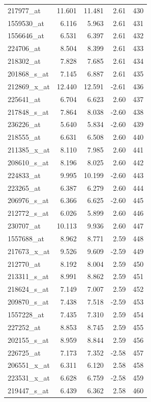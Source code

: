 \begin{footnotesize}
\begin{longtable}{lrrrr}
217977\_at & 11.601 & 11.481 & 2.61 & 430 \\
1559530\_at & 6.116 & 5.963 & 2.61 & 431 \\
1556646\_at & 6.531 & 6.397 & 2.61 & 432 \\
224706\_at & 8.504 & 8.399 & 2.61 & 433 \\
218302\_at & 7.828 & 7.685 & 2.61 & 434 \\
201868\_s\_at & 7.145 & 6.887 & 2.61 & 435 \\
212869\_x\_at & 12.440 & 12.591 & -2.61 & 436 \\
225641\_at & 6.704 & 6.623 & 2.60 & 437 \\
217848\_s\_at & 7.864 & 8.038 & -2.60 & 438 \\
236226\_at & 5.640 & 5.834 & -2.60 & 439 \\
218555\_at & 6.631 & 6.508 & 2.60 & 440 \\
211385\_x\_at & 8.110 & 7.985 & 2.60 & 441 \\
208610\_s\_at & 8.196 & 8.025 & 2.60 & 442 \\
224833\_at & 9.995 & 10.199 & -2.60 & 443 \\
223265\_at & 6.387 & 6.279 & 2.60 & 444 \\
206976\_s\_at & 6.366 & 6.625 & -2.60 & 445 \\
212772\_s\_at & 6.026 & 5.899 & 2.60 & 446 \\
230707\_at & 10.113 & 9.936 & 2.60 & 447 \\
1557688\_at & 8.962 & 8.771 & 2.59 & 448 \\
217673\_x\_at & 9.526 & 9.609 & -2.59 & 449 \\
212770\_at & 8.192 & 8.004 & 2.59 & 450 \\
213311\_s\_at & 8.991 & 8.862 & 2.59 & 451 \\
218624\_s\_at & 7.149 & 7.007 & 2.59 & 452 \\
209870\_s\_at & 7.438 & 7.518 & -2.59 & 453 \\
1557228\_at & 7.435 & 7.310 & 2.59 & 454 \\
227252\_at & 8.853 & 8.745 & 2.59 & 455 \\
202155\_s\_at & 8.959 & 8.844 & 2.59 & 456 \\
226725\_at & 7.173 & 7.352 & -2.58 & 457 \\
206551\_x\_at & 6.311 & 6.120 & 2.58 & 458 \\
223531\_x\_at & 6.628 & 6.759 & -2.58 & 459 \\
219447\_s\_at & 6.439 & 6.362 & 2.58 & 460 \\

\end{longtable}
\end{footnotesize}
